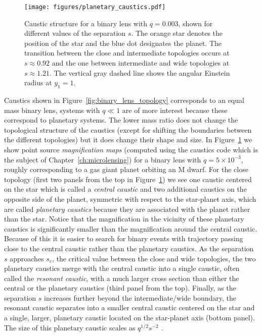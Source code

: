 \documentclass[12pt,dvipsnames]{report}
\begin{document}
\begin{figure}[t]
    \centering
    \texttt{[image: figures/planetary\_caustics.pdf]}
    \caption{Caustic structure for a binary lens with $q=0.003$, shown for different
        values of the separation $s$. The orange star denotes the position of the star and
        the blue dot designates the planet.
        The transition between the close and intermediate
        topologies occurs at $s\approx 0.92$ and the one between intermediate and wide
        topologies at $s\approx 1.21$. The vertical gray dashed line shows the angular
        Einstein radius at $y_1=1$. }
    \label{fig:planetary_caustics}
\end{figure}

Caustics shown in Figure~\ref{fig:binary_lens_topology} corresponds to an equal
mass binary lens, systems with $q\ll 1$ are of more interest because these
correspond to planetary systems. The lower mass ratio does not change the
topological structure of the caustics (except for shifting the boundaries
between the different topologies) but it does change their shape and size. In
Figure~\ref{fig:planetary_caustics} we show point source \emph{magnification
    maps} (computed using the \textsf{caustics} code which is the subject of
Chapter~\ref{ch:microlensing}) for a binary lens with $q=5\times 10^{-3}$,
roughly corresponding to a gas giant planet orbiting an M dwarf. For the close
topology (first two panels from the top in Figure~\ref{fig:planetary_caustics})
we see one caustic centered on the star which is called a \emph{central
    caustic} and two additional caustics on the opposite side of the planet,
symmetric with respect to the star-planet axis, which are called
\emph{planetary caustics} because they are associated with the planet rather
than the star. Notice that the magnification in the vicinity of these planetary
caustics is significantly smaller than the magnification around the central
caustic. Because of this it is easier to search for binary events with
trajectory passing close to the central caustic rather than the planetary
caustics. As the separation $s$ approaches $s_c$, the critical value between
the close and wide topologies, the two planetary caustics merge with the
central caustic into a single caustic, often called the \emph{resonant
    caustic}, with a much larger cross section than either the central or the
planetary caustics (third panel from the top). Finally, as the separation $s$
increases further beyond the intermediate/wide boundary, the resonant caustic
separates into a smaller central caustic centered on the star and a single,
larger, planetary caustic located on the star-planet axis (bottom panel). The
size of this planetary caustic scales as $q^{1/2}s^{-2}$ \citep[see references
    in review by][]{Gaudi2012}.
\end{document}
